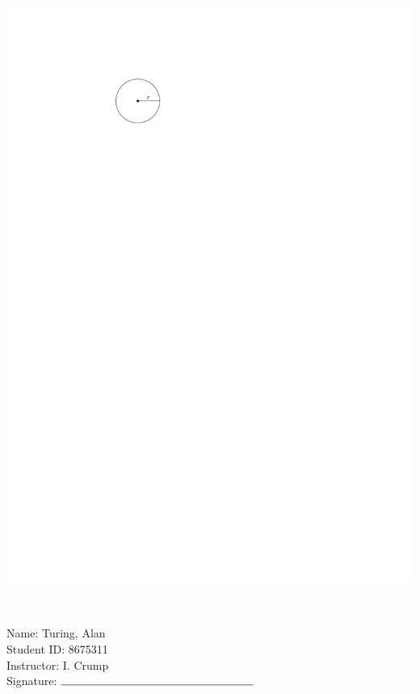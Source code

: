 \documentclass[12pt]{amsart}
\begin{document}
\begin{enumerate}
\includegraphics[scale = 0.8]{circle}

\vspace{1cm}
\newpage  $ $   \newpage\end{enumerate}\graphicspath{{C:/Users/iainc/anaconda3/Randomizer/Sample Course/Sample Assessment/}}\setcounter{page}{1}


\thispagestyle{fancy}

 \noindent Name: Turing, Alan \vspace{.3cm} \\\noindent Student ID: 8675311 \vspace{.3cm} \\\noindent Instructor: I. Crump \vspace{.3cm} \\\noindent Signature: $\rule{6cm}{0.15mm}$ \vspace{.3cm} \\ 
\end{document}
